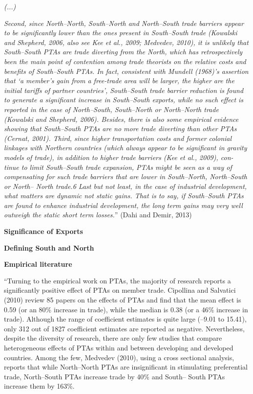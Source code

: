 \emph{(...)}

\emph{Second, since North--North, South--North and North--South trade
barriers appear to be significantly lower than the ones present in
South--South trade (Kowalski and Shepherd, 2006, also see Kee et al.,
2009; Medvedev, 2010), it is unlikely that South--South PTAs are trade
diverting from the North, which has retrospectively been the main point
of contention among trade theorists on the relative costs and benefits
of South--South PTAs. In fact, consistent with Mundell (1968)'s
assertion that `a member's gain from a free-trade area will be larger,
the higher are the initial tariffs of partner countries', South--South
trade barrier reduction is found to generate a significant increase in
South--South exports, while no such effect is reported in the case of
North--South, South--North or North--North trade (Kowalski and Shepherd,
2006). Besides, there is also some empirical evidence showing that
South--South PTAs are no more trade diverting than other PTAs (Cernat,
2001). Third, since higher transportation costs and former colonial
linkages with Northern countries (which always appear to be significant
in gravity models of trade), in addition to higher trade barriers (Kee
et al., 2009), con- tinue to limit South--South trade expansion, PTAs
might be seen as a way of compensating for such trade barriers that are
lower in South--North, North--South or North-- North trade.6 Last but
not least, in the case of industrial development, what matters are
dynamic not static gains. That is to say, if South--South PTAs are found
to enhance industrial development, the long term gains may very well
outweigh the static short term losses.}'' (Dahi and Demir, 2013)

\textbf{Significance of Exports}

\textbf{Defining South and North}

\textbf{Empirical literature}

``Turning to the empirical work on PTAs, the majority of research
reports a significantly positive effect of PTAs on member trade.
Cipollina and Salvatici (2010) review 85 papers on the effects of PTAs
and find that the mean effect is 0.59 (or an 80\% increase in trade),
while the median is 0.38 (or a 46\% increase in trade). Although the
range of coefficient estimates is quite large (--9.01 to 15.41), only
312 out of 1827 coefficient estimates are reported as negative.
Nevertheless, despite the diversity of research, there are only few
studies that compare heterogeneous effects of PTAs within and between
developing and developed countries. Among the few, Medvedev (2010),
using a cross sectional analysis, reports that while North--North PTAs
are insignificant in stimulating preferential trade, North--South PTAs
increase trade by 40\% and South-- South PTAs increase them by 163\%.

